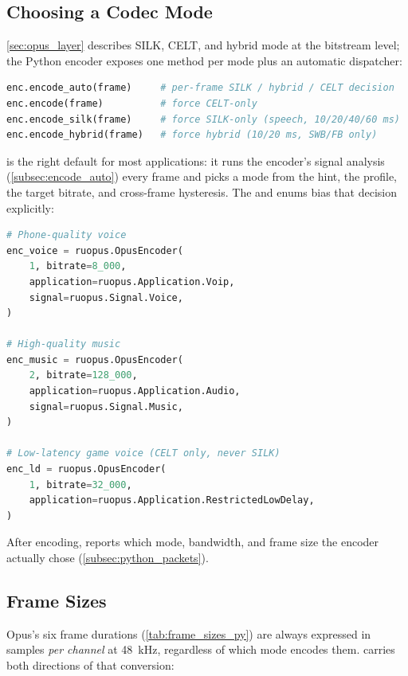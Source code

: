 \subsection{Choosing a Codec Mode}\label{subsec:python_modes}

\cref{sec:opus_layer} describes SILK, CELT, and hybrid mode at the bitstream
level; the Python encoder exposes one method per mode plus an automatic
dispatcher:

\begin{lstlisting}[language=Python]
enc.encode_auto(frame)     # per-frame SILK / hybrid / CELT decision
enc.encode(frame)          # force CELT-only
enc.encode_silk(frame)     # force SILK-only (speech, 10/20/40/60 ms)
enc.encode_hybrid(frame)   # force hybrid (10/20 ms, SWB/FB only)
\end{lstlisting}

 is the right default for most applications: it runs the
encoder's signal analysis (\cref{subsec:encode_auto}) every frame and picks a
mode from the  hint, the  profile, the target
bitrate, and cross-frame hysteresis. The  and 
enums bias that decision explicitly:

\begin{lstlisting}[language=Python]
# Phone-quality voice
enc_voice = ruopus.OpusEncoder(
    1, bitrate=8_000,
    application=ruopus.Application.Voip,
    signal=ruopus.Signal.Voice,
)

# High-quality music
enc_music = ruopus.OpusEncoder(
    2, bitrate=128_000,
    application=ruopus.Application.Audio,
    signal=ruopus.Signal.Music,
)

# Low-latency game voice (CELT only, never SILK)
enc_ld = ruopus.OpusEncoder(
    1, bitrate=32_000,
    application=ruopus.Application.RestrictedLowDelay,
)
\end{lstlisting}

After encoding,  reports which mode,
bandwidth, and frame size the encoder actually chose
(\cref{subsec:python_packets}).

\subsection{Frame Sizes}\label{subsec:python_framesizes}

Opus's six frame durations (\cref{tab:frame_sizes_py}) are always expressed in
samples \emph{per channel} at 48~kHz, regardless of which mode encodes them.
 carries both directions of that conversion:


